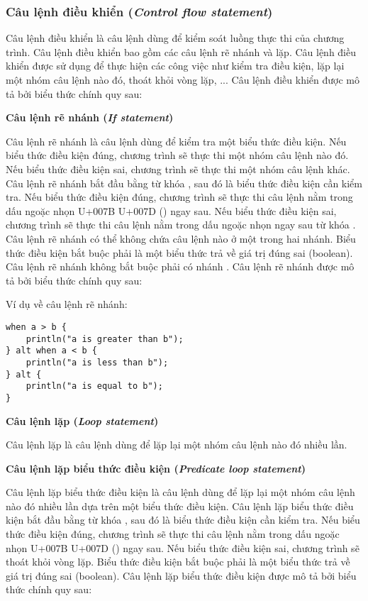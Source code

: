 \subsubsection{Câu lệnh điều khiển (\textit{Control flow statement})}

    Câu lệnh điều khiển là câu lệnh dùng để kiểm soát luồng thực thi của chương trình. Câu lệnh điều khiển bao gồm các câu lệnh rẽ nhánh và lặp. Câu lệnh điều khiển được sử dụng để thực hiện các công việc như kiểm tra điều kiện, lặp lại một nhóm câu lệnh nào đó, thoát khỏi vòng lặp, ... Câu lệnh điều khiển được mô tả bởi biểu thức chính quy sau:

\regexctrlstmt

\noindent\textbf{\label{ch2:if_stmt}Câu lệnh rẽ nhánh (\textit{If statement})}

    Câu lệnh rẽ nhánh là câu lệnh dùng để kiểm tra một biểu thức điều kiện. Nếu biểu thức điều kiện đúng, chương trình sẽ thực thi một nhóm câu lệnh nào đó. Nếu biểu thức điều kiện sai, chương trình sẽ thực thi một nhóm câu lệnh khác. Câu lệnh rẽ nhánh bắt đầu bằng từ khóa , sau đó là biểu thức điều kiện cần kiểm tra. Nếu biểu thức điều kiện đúng, chương trình sẽ thực thi câu lệnh nằm trong dấu ngoặc nhọn U+007B U+007D (\kw{\{ \}}) ngay sau. Nếu biểu thức điều kiện sai, chương trình sẽ thực thi câu lệnh nằm trong dấu ngoặc nhọn ngay sau từ khóa . Câu lệnh rẽ nhánh có thể không chứa câu lệnh nào ở một trong hai nhánh. Biểu thức điều kiện bắt buộc phải là một biểu thức trả về giá trị đúng sai (boolean). Câu lệnh rẽ nhánh không bắt buộc phải có nhánh . Câu lệnh rẽ nhánh được mô tả bởi biểu thức chính quy sau:

\regexifstmt

\noindent Ví dụ về câu lệnh rẽ nhánh:
\begin{lstlisting}[]
when a > b {
    println("a is greater than b");
} alt when a < b {
    println("a is less than b");
} alt {
    println("a is equal to b");
}
\end{lstlisting}

\noindent\textbf{Câu lệnh lặp (\textit{Loop statement})}

Câu lệnh lặp là câu lệnh dùng để lặp lại một nhóm câu lệnh nào đó nhiều lần.

\regexloopstmt

\noindent\textbf{\label{ch2:while_stmt}Câu lệnh lặp biểu thức điều kiện (\textit{Predicate loop statement})}

    Câu lệnh lặp biểu thức điều kiện là câu lệnh dùng để lặp lại một nhóm câu lệnh nào đó nhiều lần dựa trên một biểu thức điều kiện. Câu lệnh lặp biểu thức điều kiện bắt đầu bằng từ khóa , sau đó là biểu thức điều kiện cần kiểm tra. Nếu biểu thức điều kiện đúng, chương trình sẽ thực thi câu lệnh nằm trong dấu ngoặc nhọn U+007B U+007D (\kw{\{ \}}) ngay sau. Nếu biểu thức điều kiện sai, chương trình sẽ thoát khỏi vòng lặp. Biểu thức điều kiện bắt buộc phải là một biểu thức trả về giá trị đúng sai (boolean). Câu lệnh lặp biểu thức điều kiện được mô tả bởi biểu thức chính quy sau:


